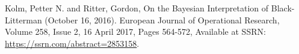 \documentclass[11pt]{article}
\theoremstyle{plain} %
\theoremstyle{remark}
\begin{document}
\newpage
\begin{thebibliography}{1}

  Kolm, Petter N. and Ritter, Gordon, On the Bayesian Interpretation of
  Black-Litterman (October 16, 2016). European Journal of Operational Research,
  Volume 258, Issue 2, 16 April 2017, Pages 564-572, Available at SSRN:
  \href{https://ssrn.com/abstract=2853158}{https://ssrn.com/abstract=2853158}.

\end{thebibliography}
\end{document}
